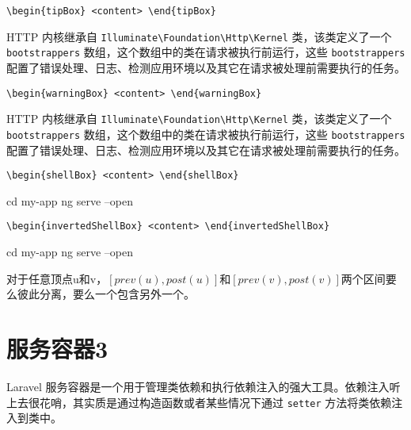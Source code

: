 \documentclass{codedump}
\begin{document}
\noindent\verb|\begin{tipBox} <content> \end{tipBox}|

\begin{tipBox}
  HTTP 内核继承自 \verb|Illuminate\Foundation\Http\Kernel| 类，该类定义了一个 \verb|bootstrappers| 数组，这个数组中的类在请求被执行前运行，这些 \verb|bootstrappers| 配置了错误处理、日志、检测应用环境以及其它在请求被处理前需要执行的任务。
\end{tipBox}

\noindent\verb|\begin{warningBox} <content> \end{warningBox}|

\begin{warningBox}
  HTTP 内核继承自 \verb|Illuminate\Foundation\Http\Kernel| 类，该类定义了一个 \verb|bootstrappers| 数组，这个数组中的类在请求被执行前运行，这些 \verb|bootstrappers| 配置了错误处理、日志、检测应用环境以及其它在请求被处理前需要执行的任务。
\end{warningBox}

\noindent\verb|\begin{shellBox} <content> \end{shellBox}|

\begin{shellBox}
cd my-app
ng serve --open
\end{shellBox}

\noindent\verb|\begin{invertedShellBox} <content> \end{invertedShellBox}|

\begin{invertedShellBox}
cd my-app
ng serve --open
\end{invertedShellBox}


\begin{property}
	对于任意顶点u和v，$[prev(u),post(u)]$和$[prev(v),post(v)]$两个区间要么彼此分离，要么一个包含另外一个。
\end{property}

\section{服务容器3}

Laravel 服务容器是一个用于管理类依赖和执行依赖注入的强大工具。依赖注入听上去很花哨，其实质是通过构造函数或者某些情况下通过 \verb|setter| 方法将类依赖注入到类中。
\end{document}
